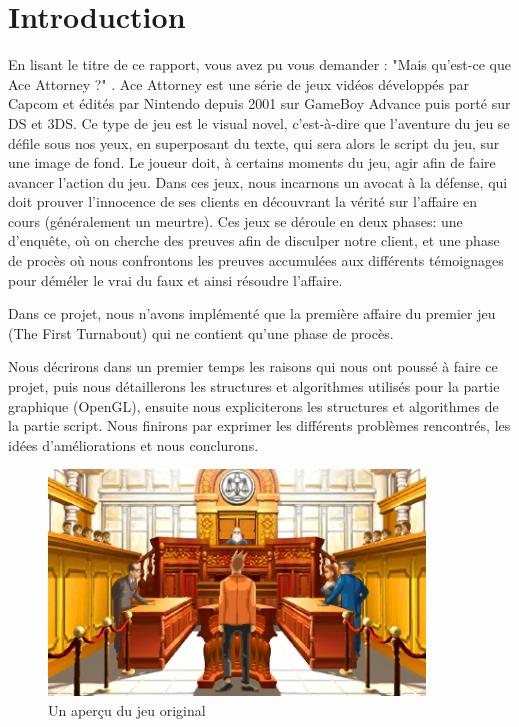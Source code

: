 \section*{Introduction} %
	En lisant le titre de ce rapport, vous avez pu vous demander : "Mais qu'est-ce que Ace Attorney ?" .\newline
	Ace Attorney est une série de jeux vidéos développés par Capcom et édités par Nintendo depuis 2001 sur GameBoy Advance puis porté sur DS et 3DS.\newline
	Ce type de jeu est le visual novel, c'est-à-dire que l'aventure du jeu se défile sous nos yeux, en superposant du texte, qui sera alors le script du jeu, sur une image de fond. Le joueur doit, à certains moments du jeu, agir afin de faire avancer l'action du jeu.\newline
	Dans ces jeux, nous incarnons un avocat à la défense, qui doit prouver l'innocence de ses clients en découvrant la vérité sur l'affaire en cours (généralement un meurtre).\newline
	Ces jeux se déroule en deux phases: une d'enquête, où on cherche des preuves afin de disculper notre client, et une phase de procès où nous confrontons les preuves accumulées aux différents témoignages pour déméler le vrai du faux et ainsi résoudre l'affaire.\newline
	
	Dans ce projet, nous n'avons implémenté que la première affaire du premier jeu (The First Turnabout) qui ne contient qu'une phase de procès.\newline
	
	Nous décrirons dans un premier temps les raisons qui nous ont poussé à faire ce projet, puis nous détaillerons les structures et algorithmes utilisés pour la partie graphique (OpenGL), ensuite nous expliciterons les structures et algorithmes de la partie script. Nous finirons par exprimer les différents problèmes rencontrés, les idées d'améliorations et nous conclurons.
	
\begin{figure}[!ht]
	\centering
	\includegraphics [width=10cm]{images/aa_screen_original.jpg}
	\caption{Un aperçu du jeu original}
	\label {screen_game}
\end{figure}